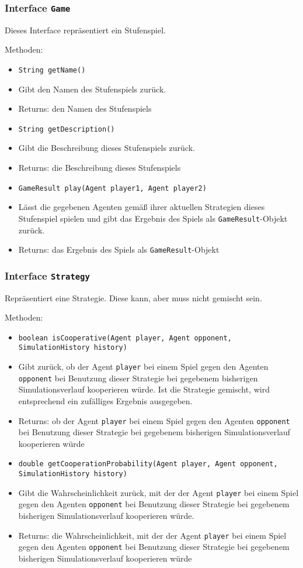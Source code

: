 \documentclass[parskip=full,11pt]{scrartcl}
\begin{document}
\subsubsection{Interface \texttt{Game}}
Dieses Interface repräsentiert ein Stufenspiel.

Methoden:
\begin{itemize}\itemsep -10pt
\item \texttt{String getName()}
\item[] Gibt den Namen des Stufenspiels zurück.
\item[] Returns: den Namen des Stufenspiels

\item \texttt{String getDescription()}
\item[] Gibt die Beschreibung dieses Stufenspiels zurück.
\item[] Returns: die Beschreibung dieses Stufenspiels

\item[] \texttt{GameResult play(Agent player1, Agent player2)}
\item[] Lässt die gegebenen Agenten gemäß ihrer aktuellen Strategien dieses Stufenspiel spielen und gibt das Ergebnis des Spiels als \texttt{GameResult}-Objekt zurück.
\item[] Returns: das Ergebnis des Spiels als \texttt{GameResult}-Objekt
\end{itemize}

\subsubsection{Interface \texttt{Strategy}}
Repräsentiert eine Strategie. Diese kann, aber muss nicht gemischt sein.

Methoden:
\begin{itemize}\itemsep -10pt
\item \texttt{boolean isCooperative(Agent player, Agent opponent, SimulationHistory history)}
\item[] Gibt zurück, ob der Agent \texttt{player} bei einem Spiel gegen den Agenten \texttt{opponent} bei Benutzung dieser Strategie bei gegebenem bisherigen Simulationsverlauf kooperieren würde. Ist die Strategie gemischt, wird entsprechend ein zufälliges Ergebnis ausgegeben.
\item[] Returns: ob der Agent \texttt{player} bei einem Spiel gegen den Agenten \texttt{opponent} bei Benutzung dieser Strategie bei gegebenem bisherigen Simulationsverlauf kooperieren würde

\item \texttt{double getCooperationProbability(Agent player, Agent opponent, SimulationHistory history)}
\item[] Gibt die Wahrscheinlichkeit zurück, mit der der Agent \texttt{player} bei einem Spiel gegen den Agenten \texttt{opponent} bei Benutzung dieser Strategie bei gegebenem bisherigen Simulationsverlauf kooperieren würde.
\item[] Returns: die Wahrscheinlichkeit, mit der der Agent \texttt{player} bei einem Spiel gegen den Agenten \texttt{opponent} bei Benutzung dieser Strategie bei gegebenem bisherigen Simulationsverlauf kooperieren würde
\end{itemize}
\end{document}

